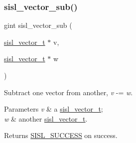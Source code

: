 \subsubsection{\texorpdfstring{sisl\+\_\+vector\+\_\+sub()}{sisl\_vector\_sub()}}
{\footnotesize\ttfamily gint sisl\+\_\+vector\+\_\+sub (\begin{DoxyParamCaption}\item[{\mbox{\hyperlink{group__vector_gacbac585492f5005f05f0c0b8463039be}{sisl\+\_\+vector\+\_\+t}} $\ast$}]{v,  }\item[{\mbox{\hyperlink{group__vector_gacbac585492f5005f05f0c0b8463039be}{sisl\+\_\+vector\+\_\+t}} $\ast$}]{w }\end{DoxyParamCaption})}

Subtract one vector from another, {\itshape v} -\/= {\itshape w}.


\begin{DoxyParams}{Parameters}
{\em v} & a \mbox{\hyperlink{group__vector_gacbac585492f5005f05f0c0b8463039be}{sisl\+\_\+vector\+\_\+t}}; \\
\hline
{\em w} & another \mbox{\hyperlink{group__vector_gacbac585492f5005f05f0c0b8463039be}{sisl\+\_\+vector\+\_\+t}}.\\
\hline
\end{DoxyParams}
\begin{DoxyReturn}{Returns}
\mbox{\hyperlink{group__status_gga82c112a16803c9ddebc065a1b0f16287a60b9f04752a2c4dd6214f8a4fd7d913b}{S\+I\+S\+L\+\_\+\+S\+U\+C\+C\+E\+SS}} on success. 
\end{DoxyReturn}
